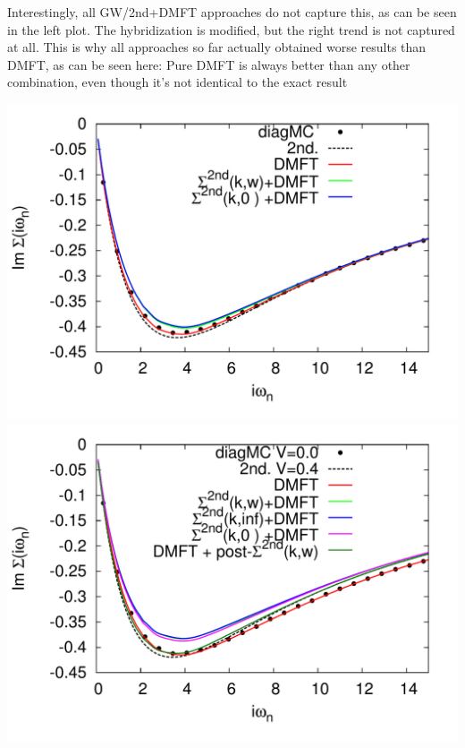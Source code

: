 \documentclass[12pt,a4paper]{scrartcl}
\numberwithin{equation}{section}
\begin{document}
\bigskip

Interestingly, all GW/2nd+DMFT approaches do not capture this, as can be seen in the left plot.
The hybridization is modified, but the right trend is not captured at all.
This is why all approaches so far actually obtained worse results than DMFT, as can be seen here:
Pure DMFT is always better than any other combination, even though it's not identical to the exact result

\includegraphics[width=1\textwidth]{figs/dmft2nd_V00.pdf}
\includegraphics[width=1\textwidth]{figs/dmft2nd_V04.pdf}



\end{document}
